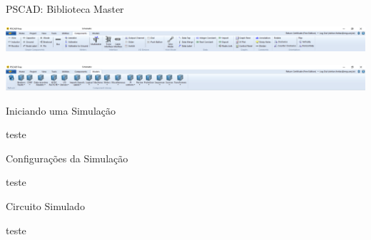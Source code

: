 \begin{frame}{PSCAD: Biblioteca Master}
\centering


\includegraphics[width=0.85\linewidth]{./figuras/Primeiros-Passos/biblioteca_barra_components}
\vspace*{1cm}

\includegraphics[width=0.85\linewidth]{./figuras/Primeiros-Passos/biblioteca_barra_models}

\end{frame}





\begin{frame}{Iniciando uma Simulação}
\centering

teste

\end{frame}






\begin{frame}{Configurações da Simulação}
\centering

teste

\end{frame}





\begin{frame}{Circuito Simulado}
\centering

teste

\end{frame}



